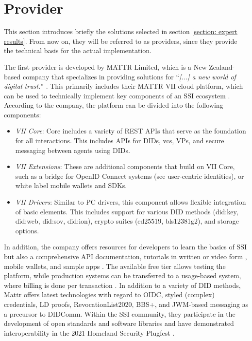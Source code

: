     \section{Provider}
    
    This section introduces briefly the solutions selected in section \ref{section: expert results}. From now on, they will be referred to as providers, since they provide the technical basis for the actual implementation.
    
    The first provider is developed by MATTR Limited, which is a New Zealand-based company \cite{mattr_privacy_2021} that specializes in providing solutions for “\textit{[...] a new world of digital trust.}” \cite{mattr_mattr_2021-4}. This primarily includes their MATTR VII cloud platform, which can be used to technically implement key components of an \ac{SSI} ecosystem \cite{mattr_products_2021}. According to the company, the platform can be divided into the following components: \cite{mattr_mattr_2021-2}

    \begin{itemize}
        \item \textit{VII Core}: Core includes a variety of REST APIs that serve as the foundation for all interactions. This includes APIs for \acp{DID}, \acp{vc}, \acp{VP}, and secure messaging between agents using \acp{DID}. \cite{mattr_vii_2021}
        \item \textit{VII Extensions}: These are additional components that build on VII Core, such as a bridge for OpenID Connect systems (see user-centric identities), or white label mobile wallets and SDKs. \cite{mattr_vii_2021-1}
        \item \textit{VII Drivers}: Similar to PC drivers, this component allows flexible integration of basic elements. This includes support for various DID methods (did:key, did:web, did:sov, did:ion), crypto suites (ed25519, bls12381g2)\cite{mattr_vii_2021-2}, and storage options. \cite{mattr_vii_2021-3}
    \end{itemize}
    
    In addition, the company offers resources for developers to learn the basics of SSI \cite{mattr_resources_2021} but also a comprehensive API documentation, tutorials in written or video form \cite{mattr_mattr_2021}, mobile wallets, and sample apps \cite{mattr_mattr_2021-1, mattr_vii_2021}. The available free tier allows testing the platform, while production systems can be transferred to a usage-based system, where billing is done per transaction \cite{mattr_mattr_2021-3}. In addition to a variety of DID methods, Mattr offers latest technologies with regard to OIDC, styled (complex) credentials, LD proofs, RevocationList2020, BBS+, and JWM-based messaging as a precursor to DIDComm. Within the \ac{SSI} community, they participate in the development of open standards \cite{mattr_approach_2021, looker_bbs_2021} and software libraries \cite{mattr_mattr_2021-5} and have demonstrated interoperability in the 2021 Homeland Security Plugfest  \cite{homeland_security_interoperability_2021}.
    
